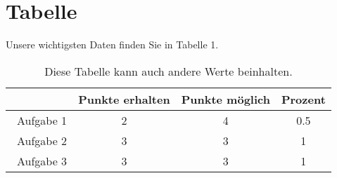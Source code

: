 \documentclass[12pt,a4paper]{article}
\begin{document}
\section{Tabelle}
Unsere wichtigsten Daten finden Sie in Tabelle 1. \
\begin{table}
\centering
\begin{tabular}{c|c|c|c}
\ {} & Punkte erhalten & Punkte m\"oglich & Prozent \\
\hline
\ Aufgabe 1 & 2 & 4 & 0.5 \\
\ Aufgabe 2 & 3 & 3 & 1 \\
\ Aufgabe 3 & 3 & 3 & 1 \\
\end{tabular}
\caption{Diese Tabelle kann auch andere Werte beinhalten.}
\label{Diese Tabelle kann auch andere Werte beinhalten.}
\end{table}
\end{document}

